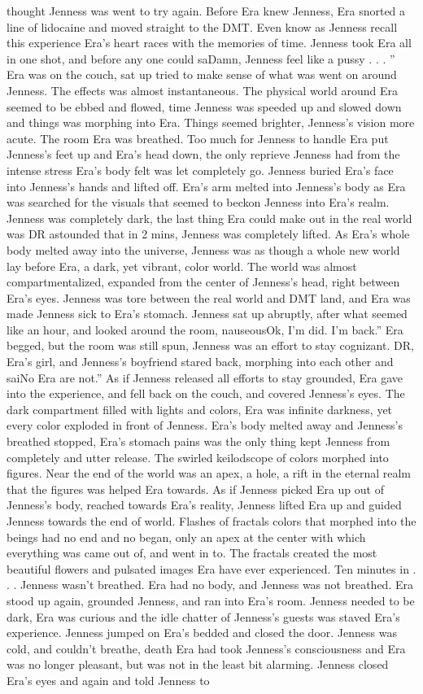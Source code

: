 \documentclass[12pt]{book}
\begin{document}
thought Jenness was went to try again. Before Era knew Jenness, Era snorted a line of lidocaine and moved straight to the DMT. Even know as Jenness recall this experience Era's heart races with the memories of time. Jenness took Era all in one shot, and before any one could saDamn, Jenness feel like a pussy . . . '' Era was on the couch, sat up tried to make sense of what was went on around Jenness. The effects was almost instantaneous. The physical world around Era seemed to be ebbed and flowed, time Jenness was speeded up and slowed down and things was morphing into Era. Things seemed brighter, Jenness's vision more acute. The room Era was breathed. Too much for Jenness to handle Era put Jenness's feet up and Era's head down, the only reprieve Jenness had from the intense stress Era's body felt was let completely go. Jenness buried Era's face into Jenness's hands and lifted off. Era's arm melted into Jenness's body as Era was searched for the visuals that seemed to beckon Jenness into Era's realm. Jenness was completely dark, the last thing Era could make out in the real world was DR astounded that in 2 mins, Jenness was completely lifted. As Era's whole body melted away into the universe, Jenness was as though a whole new world lay before Era, a dark, yet vibrant, color world. The world was almost compartmentalized, expanded from the center of Jenness's head, right between Era's eyes. Jenness was tore between the real world and DMT land, and Era was made Jenness sick to Era's stomach. Jenness sat up abruptly, after what seemed like an hour, and looked around the room, nauseousOk, I'm did. I'm back.'' Era begged, but the room was still spun, Jenness was an effort to stay cognizant. DR, Era's girl, and Jenness's boyfriend stared back, morphing into each other and saiNo Era are not.'' As if Jenness released all efforts to stay grounded, Era gave into the experience, and fell back on the couch, and covered Jenness's eyes. The dark compartment filled with lights and colors, Era was infinite darkness, yet every color exploded in front of Jenness. Era's body melted away and Jenness's breathed stopped, Era's stomach pains was the only thing kept Jenness from completely and utter release. The swirled keilodscope of colors morphed into figures. Near the end of the world was an apex, a hole, a rift in the eternal realm that the figures was helped Era towards. As if Jenness picked Era up out of Jenness's body, reached towards Era's reality, Jenness lifted Era up and guided Jenness towards the end of world. Flashes of fractals colors that morphed into the beings had no end and no began, only an apex at the center with which everything was came out of, and went in to. The fractals created the most beautiful flowers and pulsated images Era have ever experienced. Ten minutes in . . .  Jenness wasn't breathed. Era had no body, and Jenness was not breathed. Era stood up again, grounded Jenness, and ran into Era's room. Jenness needed to be dark, Era was curious and the idle chatter of Jenness's guests was staved Era's experience. Jenness jumped on Era's bedded and closed the door. Jenness was cold, and couldn't breathe, death Era had took Jenness's consciousness and Era was no longer pleasant, but was not in the least bit alarming. Jenness closed Era's eyes and again and told Jenness to 
\end{document}
